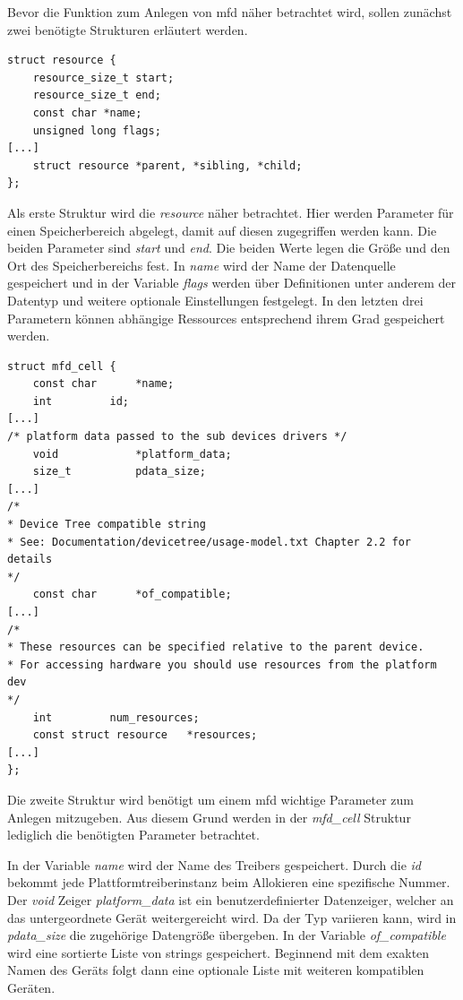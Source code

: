 Bevor die Funktion zum Anlegen von \ac{mfd} näher betrachtet wird, sollen zunächst zwei benötigte Strukturen erläutert werden.

\begin{lstfloat}
\begin{lstlisting}
struct resource {
	resource_size_t start;
	resource_size_t end;
	const char *name;
	unsigned long flags;
[...]
	struct resource *parent, *sibling, *child;
};
\end{lstlisting}
\end{lstfloat}

Als erste Struktur wird die \textit{resource} näher betrachtet. Hier werden Parameter für einen Speicherbereich abgelegt, damit auf diesen zugegriffen werden kann. 
Die beiden Parameter sind \textit{start} und \textit{end}. Die beiden Werte legen die Größe und den Ort des Speicherbereichs fest. 
In \textit{name} wird der Name der Datenquelle gespeichert und in der Variable \textit{flags} werden über Definitionen unter anderem der Datentyp und weitere optionale Einstellungen festgelegt.
In den letzten drei Parametern können abhängige Ressources entsprechend ihrem Grad gespeichert werden. \\

\begin{lstfloat}
\begin{lstlisting}
struct mfd_cell {
	const char		*name;
	int			id;
[...]
/* platform data passed to the sub devices drivers */
	void			*platform_data;
	size_t			pdata_size;	
[...]	
/*
* Device Tree compatible string
* See: Documentation/devicetree/usage-model.txt Chapter 2.2 for details
*/
	const char		*of_compatible;	
[...]	
/*
* These resources can be specified relative to the parent device.
* For accessing hardware you should use resources from the platform dev
*/
	int			num_resources;
	const struct resource	*resources;	
[...]
};
\end{lstlisting}
\end{lstfloat}

Die zweite Struktur wird benötigt um einem \ac{mfd} wichtige Parameter zum Anlegen mitzugeben. Aus diesem Grund werden in der \textit{mfd\_cell} Struktur lediglich die benötigten Parameter betrachtet. 

In der Variable \textit{name} wird der Name des Treibers gespeichert. Durch die \textit{id} bekommt jede Plattformtreiberinstanz beim Allokieren eine spezifische Nummer.
Der \textit{void} Zeiger \textit{platform\_data} ist ein benutzerdefinierter Datenzeiger, welcher an das untergeordnete Gerät weitergereicht wird. Da der Typ variieren kann, wird in \textit{pdata\_size} die zugehörige Datengröße übergeben. 
In der Variable \textit{of\_compatible} wird eine sortierte Liste von strings gespeichert. Beginnend mit dem exakten Namen des Geräts folgt dann eine optionale Liste mit weiteren kompatiblen Geräten. \cite[Zeile 116ff.]{linuxsourcedocu} %

